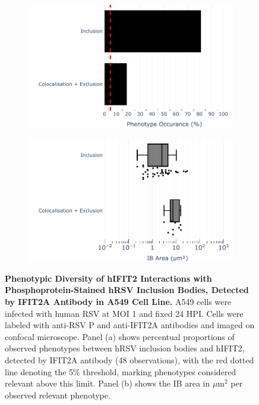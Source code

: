 \begin{figure}
    \begin{subfigure}{0.495\textwidth}
        \caption{}
        \includegraphics[width=1\linewidth]{08. Chapter 3/Figs/02. Infection/02. IFIT2/01. IFIT2A/04. bar_i2a_a549-p.pdf} 
    \end{subfigure}
    \begin{subfigure}{0.495\textwidth}
        \caption{}
        \includegraphics[width=1\linewidth]{08. Chapter 3/Figs/02. Infection/02. IFIT2/01. IFIT2A/05. box_i2a_a549-p.pdf}
    \end{subfigure}
    \caption[Phenotypic Diversity of hIFIT2 Interactions with Phosphoprotein-Stained hRSV Inclusion Bodies, Detected by IFIT2A Antibody in A549 Cell Line.]{\textbf{Phenotypic Diversity of hIFIT2 Interactions with Phosphoprotein-Stained hRSV Inclusion Bodies, Detected by IFIT2A Antibody in A549 Cell Line.} A549 cells were infected with human RSV at MOI 1 and fixed 24 HPI. Cells were labeled with anti-RSV P and anti-IFIT2A antibodies and imaged on confocal microscope. Panel (a) shows percentual proportions of observed phenotypes between hRSV inclusion bodies and hIFIT2, detected by IFIT2A antibody (48 observations), with the red dotted line denoting the 5\% threshold, marking phenotypes considered relevant above this limit. Panel (b) shows the IB area in \(\mu \mbox{m}^2\) per observed relevant phenotype.}
    \label{fig:Phenotypic Diversity of hIFIT2 Interactions with Phosphoprotein-Stained hRSV Inclusion Bodies, Detected by IFIT2A Antibody in A549 Cell Line}
\end{figure}

